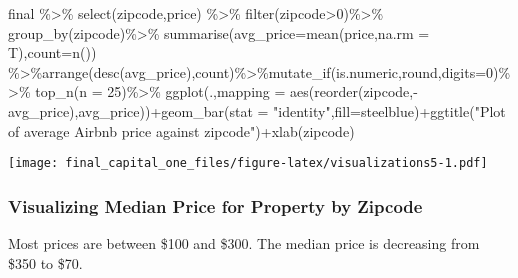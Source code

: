 \documentclass[
]{article}
\newenvironment{Shaded}{\begin{snugshade}}{\end{snugshade}}
\newcommand{\AttributeTok}[1]{\textcolor[rgb]{0.77,0.63,0.00}{#1}}
\newcommand{\DecValTok}[1]{\textcolor[rgb]{0.00,0.00,0.81}{#1}}
\newcommand{\FunctionTok}[1]{\textcolor[rgb]{0.00,0.00,0.00}{#1}}
\newcommand{\NormalTok}[1]{#1}
\newcommand{\SpecialCharTok}[1]{\textcolor[rgb]{0.00,0.00,0.00}{#1}}
\newcommand{\StringTok}[1]{\textcolor[rgb]{0.31,0.60,0.02}{#1}}
\begin{document}
\begin{Shaded}
\begin{Highlighting}[]
\NormalTok{final }\SpecialCharTok{\%\textgreater{}\%} \FunctionTok{select}\NormalTok{(zipcode,price) }\SpecialCharTok{\%\textgreater{}\%} \FunctionTok{filter}\NormalTok{(zipcode}\SpecialCharTok{\textgreater{}}\DecValTok{0}\NormalTok{)}\SpecialCharTok{\%\textgreater{}\%} \FunctionTok{group\_by}\NormalTok{(zipcode)}\SpecialCharTok{\%\textgreater{}\%} \FunctionTok{summarise}\NormalTok{(}\AttributeTok{avg\_price=}\FunctionTok{mean}\NormalTok{(price,}\AttributeTok{na.rm =}\NormalTok{ T),}\AttributeTok{count=}\FunctionTok{n}\NormalTok{()) }\SpecialCharTok{\%\textgreater{}\%}\FunctionTok{arrange}\NormalTok{(}\FunctionTok{desc}\NormalTok{(avg\_price),count)}\SpecialCharTok{\%\textgreater{}\%}\FunctionTok{mutate\_if}\NormalTok{(is.numeric,round,}\AttributeTok{digits=}\DecValTok{0}\NormalTok{)}\SpecialCharTok{\%\textgreater{}\%} \FunctionTok{top\_n}\NormalTok{(}\AttributeTok{n =} \DecValTok{25}\NormalTok{)}\SpecialCharTok{\%\textgreater{}\%} \FunctionTok{ggplot}\NormalTok{(.,}\AttributeTok{mapping =} \FunctionTok{aes}\NormalTok{(}\FunctionTok{reorder}\NormalTok{(zipcode,}\SpecialCharTok{{-}}\NormalTok{avg\_price),avg\_price))}\SpecialCharTok{+}\FunctionTok{geom\_bar}\NormalTok{(}\AttributeTok{stat =} \StringTok{"identity"}\NormalTok{,}\AttributeTok{fill=}\StringTok{\textquotesingle{}steelblue\textquotesingle{}}\NormalTok{)}\SpecialCharTok{+}\FunctionTok{ggtitle}\NormalTok{(}\StringTok{"Plot of average Airbnb price against zipcode"}\NormalTok{)}\SpecialCharTok{+}\FunctionTok{xlab}\NormalTok{(}\StringTok{\textquotesingle{}zipcode\textquotesingle{}}\NormalTok{)}
\end{Highlighting}
\end{Shaded}

\texttt{[image: final\_capital\_one\_files/figure-latex/visualizations5-1.pdf]}

\hypertarget{visualizing-median-price-for-property-by-zipcode}{%
\subsubsection{Visualizing Median Price for Property by
Zipcode}\label{visualizing-median-price-for-property-by-zipcode}}

Most prices are between \$100 and \$300. The median price is decreasing
from \$350 to \$70.
\end{document}
